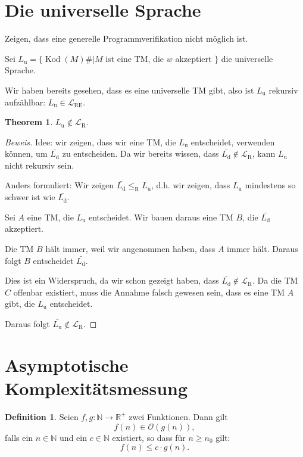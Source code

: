 \documentclass[11pt]{article} %
\theoremstyle{definition}
\newtheorem{definition}{Definition}
\newtheorem{theorem}{Theorem}
\begin{document}
\section{Die universelle Sprache}

Zeigen, dass eine generelle Programmverifikation nicht möglich ist.

Sei $L_\textrm{u} = \{\operatorname{Kod}(M)\# | M $ ist eine TM, die $w$ akzeptiert $\}$ die universelle Sprache.

Wir haben bereits gesehen, dass es eine universelle TM gibt, also ist $L_\textrm{u}$ rekursiv aufzählbar: $L_\textrm{u} \in \mathcal{L}_\textrm{RE}$.

\begin{theorem}
$L_\textrm{u} \notin \mathcal{L}_\textrm{R}$.
\end{theorem}

\begin{proof}[Beweis]
Idee: wir zeigen, dass wir eine TM, die $L_\textrm{u}$ entscheidet, verwenden können, um $\bar{L_\textrm{d}}$ zu entscheiden.
Da wir bereits wissen, dass $\bar{L_\textrm{d}} \notin \mathcal{L}_\textrm{R}$, kann $L_\textrm{u}$ nicht rekursiv sein.

Anders formuliert: Wir zeigen $\bar{L_\textrm{d}} \le_\textrm{R} L_\textrm{u}$, d.h. wir zeigen, dass $L_\textrm{u}$ mindestens so schwer ist wie $\bar{L_\textrm{d}}$.

Sei $A$ eine TM, die $L_\textrm{u}$ entscheidet. Wir bauen daraus eine TM $B$, die $\bar{L_\textrm{d}}$ akzeptiert.

Die TM $B$ hält immer, weil wir angenommen haben, dass $A$ immer hält. Daraus folgt $B$ entscheidet $\bar{L_\textrm{d}}$.

Dies ist ein Widerspruch, da wir schon gezeigt haben, dass $\bar{L_\textrm{d}} \notin \mathcal{L}_\textrm{R}$. Da die TM $C$ offenbar existiert, muss die Annahme falsch gewesen sein, dass es eine TM $A$ gibt, die $L_\textrm{u}$ entscheidet.

Daraus folgt $\bar{L_\textrm{u}} \notin \mathcal{L}_\textrm{R}$.

\end{proof}

\renewcommand{\O}{\mathcal{O}}

\section{Asymptotische Komplexitätsmessung}

\begin{definition}
Seien $f, g : \mathbb{N} \rightarrow \mathbb{R}^+ $ zwei Funktionen. Dann gilt
\[
f(n) \in \O(g(n)),
\]
falls ein $n \in \mathbb{N}$ und ein $c \in \mathbb{N}$ existiert, so dass für $n \ge n_0$ gilt:
\[
f(n) \le c\cdot g(n).
\]
\end{definition}
\end{document}

